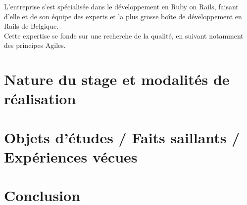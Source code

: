 \documentclass{report}
\begin{document}
  L'entreprise s'est spécialisée dans le développement en Ruby on Rails, faisant d'elle et de son équipe des experts et la plus grosse
  boîte de développement en Rails de Belgique.\\
  Cette expertise se fonde sur une recherche de la qualité, en suivant notamment des principes Agiles.\\

  

\chapter{Nature du stage et modalités de réalisation}

\chapter{Objets d'études / Faits saillants / Expériences vécues}

\chapter{Conclusion}
\end{document}
